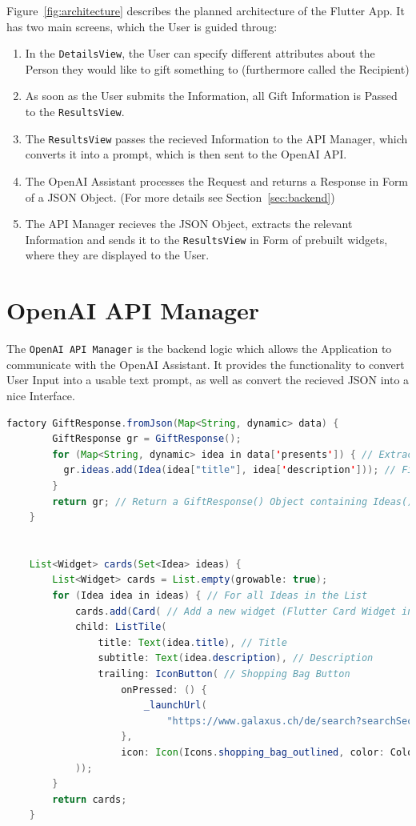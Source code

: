 Figure~\ref{fig:architecture} describes the planned architecture of the Flutter App. It has two main screens, which the User is guided throug:
\begin{enumerate}
	\item In the \texttt{DetailsView}, the User can specify different attributes about the Person they would like to gift something to (furthermore called the Recipient)

	\item As soon as the User submits the Information, all Gift Information is Passed to the \texttt{ResultsView}.

	\item The \texttt{ResultsView} passes the recieved Information to the API Manager, which converts it into a prompt, which is then sent to the OpenAI API.

	\item The OpenAI Assistant processes the Request and returns a Response in Form of a JSON Object. (For more details see Section~\ref{sec:backend})

	\item The API Manager recieves the JSON Object, extracts the relevant Information and sends it to the \texttt{ResultsView} in Form of prebuilt widgets, where they are displayed to the User.
\end{enumerate}

\section*{OpenAI API Manager}

The \texttt{OpenAI API Manager} is the backend logic which allows the Application to communicate with the OpenAI Assistant. It provides the functionality to convert User Input into a usable text prompt, as well as convert the recieved JSON into a nice Interface.

\begin{lstlisting}[language=Java]
    factory GiftResponse.fromJson(Map<String, dynamic> data) {
        GiftResponse gr = GiftResponse();
        for (Map<String, dynamic> idea in data['presents']) { // Extract "present" objects
          gr.ideas.add(Idea(idea["title"], idea['description'])); // Fill information into new Idea() Object
        }
        return gr; // Return a GiftResponse() Object containing Ideas()
    }

    
    List<Widget> cards(Set<Idea> ideas) {
        List<Widget> cards = List.empty(growable: true);
        for (Idea idea in ideas) { // For all Ideas in the List
            cards.add(Card( // Add a new widget (Flutter Card Widget in this Case)
            child: ListTile(
                title: Text(idea.title), // Title
                subtitle: Text(idea.description), // Description
                trailing: IconButton( // Shopping Bag Button
                    onPressed: () {
                        _launchUrl(
                            "https://www.galaxus.ch/de/search?searchSectors=0&q=${idea.title}");
                    },
                    icon: Icon(Icons.shopping_bag_outlined, color: Colors.green,))),
            ));
        }
        return cards;
    }
\end{lstlisting}

